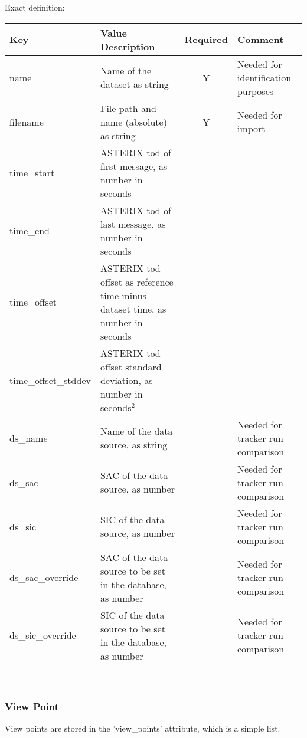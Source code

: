 Exact definition:

\begin{center}
 \begin{table}[H]
  \begin{tabularx}{\textwidth}{ | l | X | c | X | }
    \hline
    \textbf{Key} & \textbf{Value Description} & \textbf{Required} & \textbf{Comment} \\ \hline
    name & Name of the dataset as string & Y & Needed for identification purposes \\ \hline
    filename & File path and name (absolute) as string & Y & Needed for import \\ \hline
    time\_start & ASTERIX tod of first message, as number in seconds & & \\ \hline
    time\_end & ASTERIX tod of last message, as number in seconds & & \\ \hline
    time\_offset & ASTERIX tod offset as reference time minus dataset time, as number in seconds & & \\ \hline
    time\_offset\_stddev & ASTERIX tod offset standard deviation, as number in seconds$^2$ & & \\ \hline
    ds\_name & Name of the data source, as string &  & Needed for tracker run comparison \\ \hline
    ds\_sac & SAC of the data source, as number & & Needed for tracker run comparison \\ \hline
    ds\_sic & SIC of the data source, as number & & Needed for tracker run comparison \\ \hline
    ds\_sac\_override & SAC of the data source to be set in the database, as number & & Needed for tracker run comparison \\ \hline
    ds\_sic\_override & SIC of the data source to be set in the database, as number & & Needed for tracker run comparison \\ \hline
\end{tabularx}
\end{table}
\end{center}
\ \\

\subsubsection{View Point}

View points are stored in the 'view\_points' attribute, which is a simple list. \\

